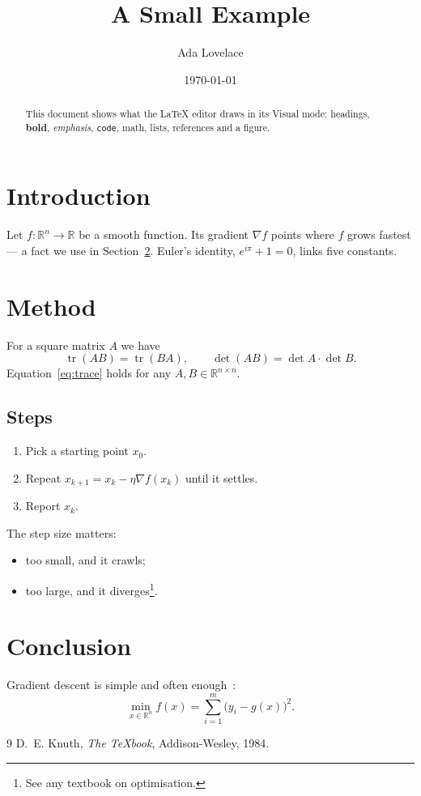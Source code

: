 \documentclass[11pt]{article}
\title{A Small Example}
\author{Ada Lovelace}
\date{\today}
\newcommand{\R}{\mathbb{R}}
\DeclareMathOperator{\tr}{tr}
\begin{document}
\maketitle

\begin{abstract}
This document shows what the \LaTeX{} editor draws in its Visual mode: headings, \textbf{bold}, \emph{emphasis},
\texttt{code}, math, lists, references and a figure.
\end{abstract}

\section{Introduction}
\label{sec:intro}

Let $f\colon \R^n \to \R$ be a smooth function. Its gradient $\nabla f$ points
where $f$ grows fastest --- a fact we use in Section~\ref{sec:method}.
Euler's identity, $e^{i\pi} + 1 = 0$, links five constants.


\section{Method}
\label{sec:method}

For a square matrix $A$ we have
\begin{equation}
  \tr(AB) = \tr(BA), \qquad \det(AB) = \det A \cdot \det B.
  \label{eq:trace}
\end{equation}
Equation~\eqref{eq:trace} holds for any $A, B \in \R^{n\times n}$.

\subsection{Steps}

\begin{enumerate}
  \item Pick a starting point $x_0$.
  \item Repeat $x_{k+1} = x_k - \eta \nabla f(x_k)$ until it settles.
  \item Report $x_k$.
\end{enumerate}

The step size matters:
\begin{itemize}
  \item too small, and it crawls;
  \item too large, and it diverges\footnote{See any textbook on optimisation.}.
\end{itemize}

\section{Conclusion}

Gradient descent is simple and often enough~\cite{knuth1984}:
\[
  \min_{x \in \R^n} f(x) = \sum_{i=1}^{m} \bigl(y_i - g(x)\bigr)^2 .
\]

\begin{thebibliography}{9}
 D.~E. Knuth, \emph{The \TeX book}, Addison-Wesley, 1984.
\end{thebibliography}
\end{document}
